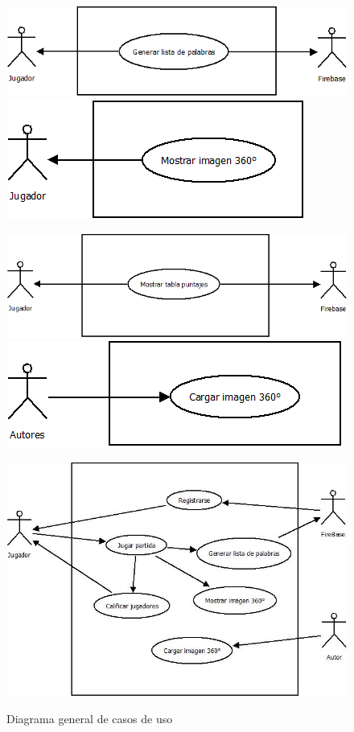 \begin{figure}[H]
\centering
   \includegraphics[scale=0.5]{imgs/DiagramaCasoUso3.png}
   \includegraphics[scale=0.5]{imgs/DiagramaCasoUso4.png}
\end{figure}

\begin{figure}[H]
   \includegraphics[scale=0.4]{imgs/DiagramaCasoUso5.png}
   \includegraphics[scale=0.5]{imgs/DiagramaCasoUso6.png}
\end{figure}

\begin{figure}[H]
\centering
   \includegraphics[scale=0.9]{imgs/DCUs.jpeg}
   \begin{center}
   Diagrama general de casos de uso
   \end{center}
\end{figure}
